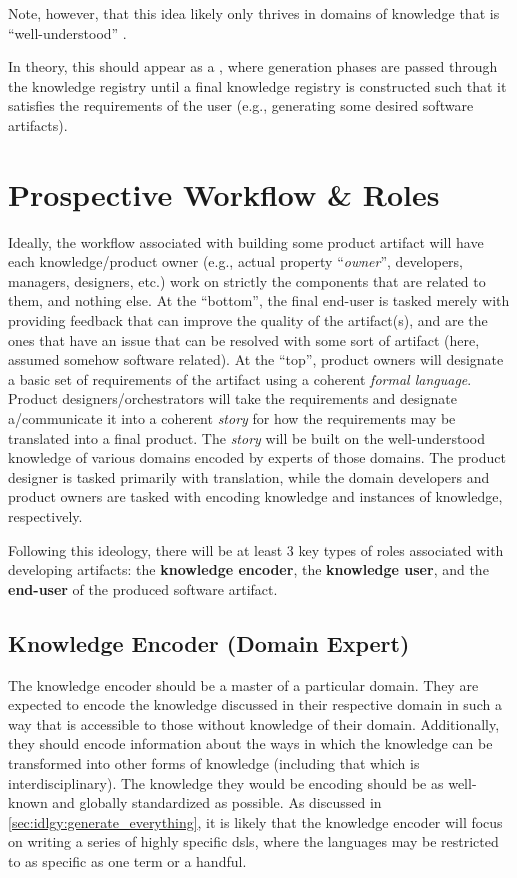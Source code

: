 Note, however, that this idea likely only thrives in domains of knowledge that
is ``well-understood'' \cite{well-understood}.

In theory, this should appear as a , where generation phases are passed
through the knowledge registry until a final knowledge registry is constructed
such that it satisfies the requirements of the user (e.g., generating some
desired software artifacts).

\section{Prospective Workflow \& Roles}
\label{sec:idlgy:prospective_workflow}

Ideally, the workflow associated with building some product artifact will have
each knowledge/product owner (e.g., actual property ``\textit{owner}'',
developers, managers, designers, etc.) work on strictly the components that are
related to them, and nothing else. At the ``bottom'', the final end-user is
tasked merely with providing feedback that can improve the quality of the
artifact(s), and are the ones that have an issue that can be resolved with some
sort of artifact (here, assumed somehow software related). At the ``top'',
product owners will designate a basic set of requirements of the artifact using
a coherent \textit{formal language}. Product designers/orchestrators will take
the requirements and designate a/communicate it into a coherent \textit{story}
for how the requirements may be translated into a final product. The
\textit{story} will be built on the well-understood knowledge of various domains
encoded by experts of those domains. The product designer is tasked primarily
with translation, while the domain developers and product owners are tasked with
encoding knowledge and instances of knowledge, respectively.

Following this ideology, there will be at least 3 key types of roles associated
with developing artifacts: the \textbf{knowledge encoder}, the \textbf{knowledge
user}, and the \textbf{end-user} of the produced software artifact.

\subsection{Knowledge Encoder (Domain Expert)}

The knowledge encoder should be a master of a particular domain. They are
expected to encode the knowledge discussed in their respective domain in such a
way that is accessible to those without knowledge of their domain. Additionally,
they should encode information about the ways in which the knowledge can be
transformed into other forms of knowledge (including that which is
interdisciplinary). The knowledge they would be encoding should be as well-known
and globally standardized as possible. As discussed in
\autoref{sec:idlgy:generate_everything}, it is likely that the knowledge encoder
will focus on writing a series of highly specific \aclp{dsl}, where the
languages may be restricted to as specific as one term or a handful.

